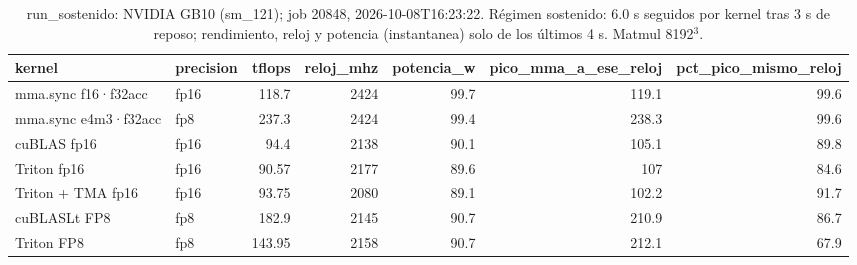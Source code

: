 \begin{table}[htbp]
  \centering\small
  \begin{tabular}{llrrrrr}
    \toprule
    kernel & precision & tflops & reloj\_mhz & potencia\_w & pico\_mma\_a\_ese\_reloj & pct\_pico\_mismo\_reloj \\
    \midrule
    mma.sync f16·f32acc & fp16 & 118.7 & 2424 & 99.7 & 119.1 & 99.6 \\
    mma.sync e4m3·f32acc & fp8 & 237.3 & 2424 & 99.4 & 238.3 & 99.6 \\
    cuBLAS fp16 & fp16 & 94.4 & 2138 & 90.1 & 105.1 & 89.8 \\
    Triton fp16 & fp16 & 90.57 & 2177 & 89.6 & 107 & 84.6 \\
    Triton + TMA fp16 & fp16 & 93.75 & 2080 & 89.1 & 102.2 & 91.7 \\
    cuBLASLt FP8 & fp8 & 182.9 & 2145 & 90.7 & 210.9 & 86.7 \\
    Triton FP8 & fp8 & 143.95 & 2158 & 90.7 & 212.1 & 67.9 \\
    \bottomrule
  \end{tabular}
  \caption{run\_sostenido: NVIDIA GB10 (sm\_121); job 20848, 2026-10-08T16:23:22. Régimen sostenido: 6.0 s seguidos por kernel tras 3 s de reposo; rendimiento, reloj y potencia (instantanea) solo de los últimos 4 s. Matmul 8192$^3$.}
  \label{tab:hennessy-run-sostenido}
\end{table}
